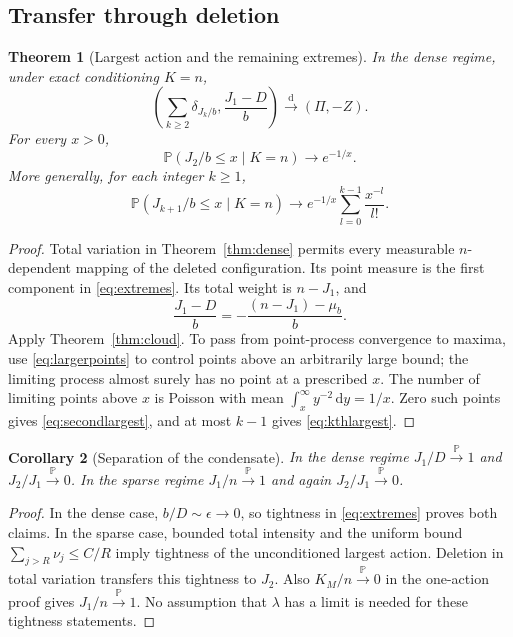 \documentclass[11pt,a4paper]{article}
\numberwithin{equation}{section}
\newtheorem{theorem}{Theorem}[section]
\newtheorem{corollary}[theorem]{Corollary}
\theoremstyle{definition}
\theoremstyle{remark}
\newcommand{\Prob}{\mathbb P}
\newcommand{\ee}{\epsilon}
\newcommand{\dd}{\,\mathrm d}
\newcommand{\dto}{\xrightarrow{\mathrm d}}
\newcommand{\pto}{\xrightarrow{\Prob}}
\begin{document}
\subsection{Transfer through deletion}
\begin{theorem}[Largest action and the remaining extremes]\label{thm:extremes}
In the dense regime, under exact conditioning $K=n$,
\begin{equation}\label{eq:extremes}
 \left(\sum_{k\ge2}\delta_{J_k/b},\frac{J_1-D}{b}\right)
 \dto(\Pi,-Z).
\end{equation}
For every $x>0$,
\begin{equation}\label{eq:secondlargest}
 \Prob(J_2/b\le x\mid K=n)\longrightarrow e^{-1/x}.
\end{equation}
More generally, for each integer $k\ge1$,
\begin{equation}\label{eq:kthlargest}
 \Prob(J_{k+1}/b\le x\mid K=n)
 \longrightarrow e^{-1/x}\sum_{l=0}^{k-1}\frac{x^{-l}}{l!}.
\end{equation}
\end{theorem}
\begin{proof}
Total variation in Theorem~\ref{thm:dense} permits every measurable
$n$-dependent mapping of the deleted configuration. Its point measure is
the first component in \eqref{eq:extremes}. Its total weight is $n-J_1$,
and
\[
 \frac{J_1-D}{b}=-\frac{(n-J_1)-\mu_b}{b}.
\]
Apply Theorem~\ref{thm:cloud}. To pass from point-process convergence to
maxima, use \eqref{eq:largerpoints} to control points above an arbitrarily
large bound; the limiting process almost surely has no point at a
prescribed $x$. The number of limiting points above $x$ is Poisson with
mean $\int_x^\infty y^{-2}\dd y=1/x$. Zero such points gives
\eqref{eq:secondlargest}, and at most $k-1$ gives \eqref{eq:kthlargest}.
\end{proof}

\begin{corollary}[Separation of the condensate]\label{cor:separation}
In the dense regime $J_1/D\pto1$ and $J_2/J_1\pto0$. In the sparse regime
$J_1/n\pto1$ and again $J_2/J_1\pto0$.
\end{corollary}
\begin{proof}
In the dense case, $b/D\sim\ee\to0$, so tightness in
\eqref{eq:extremes} proves both claims. In the sparse case, bounded total
intensity and the uniform bound $\sum_{j>R}\nu_j\le C/R$ imply tightness
of the unconditioned largest action. Deletion in total variation transfers
this tightness to $J_2$. Also $K_M/n\pto0$ in the one-action proof gives
$J_1/n\pto1$. No assumption that $\lambda$ has a limit is needed for these
tightness statements.
\end{proof}
\end{document}
